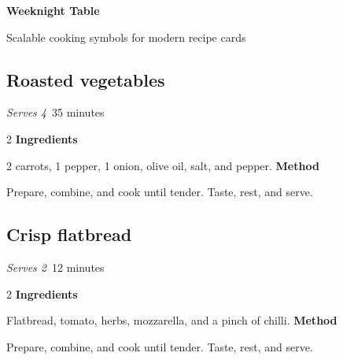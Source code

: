 \documentclass[a4paper,11pt]{article}
\newcommand{\card}[4]{%
  \subsection*{\color{herb}#1}\textit{#2}\hfill\textcolor{paprika}{#3}\par
  \smallskip
  \begin{multicols}{2}
  \textbf{Ingredients}\par #4
  \columnbreak
  \textbf{Method}\par
  Prepare, combine, and cook until tender. Taste, rest, and serve.
  \end{multicols}\medskip}
\begin{document}
\begin{center}
  {\Huge\sffamily\bfseries Weeknight Table}\par
  {\large Scalable cooking symbols for modern recipe cards}\par
  \medskip
  \TopBottomHeat[scale=0.8,color=paprika]\quad
  \ConvectionOven[scale=0.8,color=herb]\quad
  \AirFryer[scale=0.8,color=paprika]\quad
  \Pizza[scale=0.8,color=herb]
\end{center}
\card{Roasted vegetables}{Serves 4}{\ConvectionOven\ 35 minutes}{%
  2 carrots, 1 pepper, 1 onion, olive oil, salt, and pepper.}
\card{Crisp flatbread}{Serves 2}{\Pizza\ 12 minutes}{%
  Flatbread, tomato, herbs, mozzarella, and a pinch of chilli.}
\end{document}
